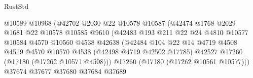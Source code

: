 \begin{lexlean}{RustStd}
\begin{coremodule}
{\begin{coremodule}
{{{{{{{{{{{{{{{{{{{{{{{{{{{{{{{{{{{{{{{{{{{{{{{{{{{{{{{                                          @10589
                                          @10968
                                          (@42702
                                            @2030
                                            @22
                                            @10578
                                            @10587
                                            (@42474
                                              @1768
                                              @2029
                                              @1681
                                              @22
                                              @10578
                                              @10585
                                              @9610
                                              (@42483
                                                @193
                                                @211
                                                @22
                                                @24
                                                @4810
                                                @10577
                                                @10584
                                                @4570
                                                @10560
                                                @4538
                                                @42638
                                                (@42484
                                                  @104
                                                  @22
                                                  @14
                                                  @4719
                                                  @4508
                                                  @4519
                                                  @4570
                                                  @10570
                                                  @4538
                                                  (@42498 @4719 @42502 @17785)
                                                  @42527
                                                  @17260
                                                  (@17180 (@17262 @10571 @4508)))
                                                @17260
                                                (@17180 (@17262 @10561 @10577)))
                                              @37674
                                              @37677
                                              @37680
                                              @37684
                                              @37689
}}}}}}}}}}}}}}}}}}}}}}}}}}}}}}}}}}}}}}}}}}}}}}}}}}}}}}}
\end{coremodule}}
\end{coremodule}
\end{lexlean}
